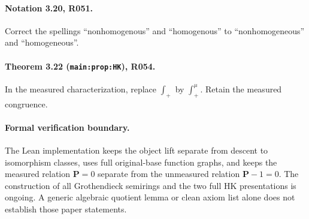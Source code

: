 \documentclass[10pt]{article}
\begin{document}
\paragraph{Notation 3.20, R051.}
Correct the spellings ``nonhomogenous'' and ``homogenous'' to
{\color{ResolutionGreen}``nonhomogeneous'' and ``homogeneous''}.

\paragraph{Theorem 3.22 (\texttt{main:prop:HK}), R054.}
In the measured characterization, replace $\int_+$ by
{\color{ResolutionGreen}$\int_+^\mu$}. Retain the measured congruence.

\paragraph{Formal verification boundary.}
The Lean implementation keeps the object lift separate from descent to
isomorphism classes, uses full original-base function graphs, and keeps
the measured relation $\mathbf P=0$ separate from the unmeasured relation
$\mathbf P-1=0$. The construction of all Grothendieck semirings and the two
full HK presentations is ongoing. A generic algebraic quotient lemma or
clean axiom list alone does not establish those paper statements.
\end{document}
